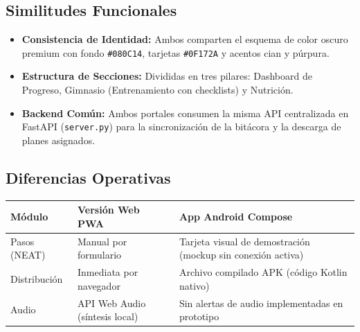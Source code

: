 \documentclass[11pt]{article}
\begin{document}
\subsection{Similitudes Funcionales}
\begin{itemize}
    \item \textbf{Consistencia de Identidad:} Ambos comparten el esquema de color oscuro premium con fondo \texttt{\#080C14}, tarjetas \texttt{\#0F172A} y acentos cian y púrpura.
    \item \textbf{Estructura de Secciones:} Divididas en tres pilares: Dashboard de Progreso, Gimnasio (Entrenamiento con checklists) y Nutrición.
    \item \textbf{Backend Común:} Ambos portales consumen la misma API centralizada en FastAPI (\texttt{server.py}) para la sincronización de la bitácora y la descarga de planes asignados.
\end{itemize}

\subsection{Diferencias Operativas}
\vspace{0.5em}
\noindent
\begin{tabularx}{\linewidth}{X X X}
    \toprule
    \textbf{Módulo} & \textbf{Versión Web PWA} & \textbf{App Android Compose} \\
    \midrule
    Pasos (NEAT) & Manual por formulario & Tarjeta visual de demostración (mockup sin conexión activa) \\
    \midrule
    Distribución & Inmediata por navegador & Archivo compilado APK (código Kotlin nativo) \\
    \midrule
    Audio & API Web Audio (síntesis local) & Sin alertas de audio implementadas en prototipo \\
    \bottomrule
\end{tabularx}
\vspace{0.5em}
\end{document}
